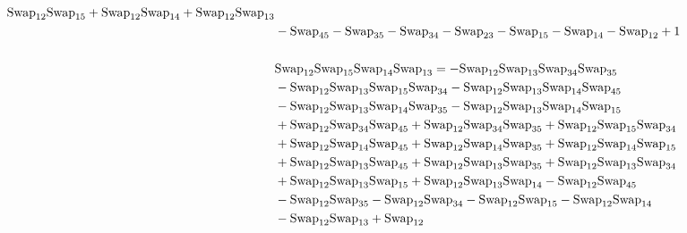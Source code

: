 \documentclass[12pt,dvipsnames,accepted=2016-08-18,a4paper,onecolumn]{quantumarticle}
\numberwithin{equation}{section}
\theoremstyle{definition}
\begin{document}
\begin{align*}
        \textnormal{Swap}_{12} \textnormal{Swap}_{15} + \textnormal{Swap}_{12} \textnormal{Swap}_{14} + \textnormal{Swap}_{12} \textnormal{Swap}_{13}\\ & - \textnormal{Swap}_{45} - \textnormal{Swap}_{35} - \textnormal{Swap}_{34} - \textnormal{Swap}_{23} - \textnormal{Swap}_{15} - \textnormal{Swap}_{14} - \textnormal{Swap}_{12} +
        1\\
        \\
        &\textnormal{Swap}_{12}   \textnormal{Swap}_{15}   \textnormal{Swap}_{14}   \textnormal{Swap}_{13} = -\textnormal{Swap}_{12} \textnormal{Swap}_{13} \textnormal{Swap}_{34} \textnormal{Swap}_{35}\\ & - \textnormal{Swap}_{12} \textnormal{Swap}_{13} \textnormal{Swap}_{15} \textnormal{Swap}_{34} - \textnormal{Swap}_{12} \textnormal{Swap}_{13} \textnormal{Swap}_{14} \textnormal{Swap}_{45}\\ & - \textnormal{Swap}_{12} \textnormal{Swap}_{13} \textnormal{Swap}_{14} \textnormal{Swap}_{35} -
        \textnormal{Swap}_{12} \textnormal{Swap}_{13} \textnormal{Swap}_{14} \textnormal{Swap}_{15}\\ & + \textnormal{Swap}_{12} \textnormal{Swap}_{34} \textnormal{Swap}_{45} + \textnormal{Swap}_{12} \textnormal{Swap}_{34} \textnormal{Swap}_{35} + \textnormal{Swap}_{12} \textnormal{Swap}_{15} \textnormal{Swap}_{34}\\ & + \textnormal{Swap}_{12} \textnormal{Swap}_{14} \textnormal{Swap}_{45}
        + \textnormal{Swap}_{12} \textnormal{Swap}_{14} \textnormal{Swap}_{35} + \textnormal{Swap}_{12} \textnormal{Swap}_{14} \textnormal{Swap}_{15}\\ & + \textnormal{Swap}_{12} \textnormal{Swap}_{13} \textnormal{Swap}_{45} + \textnormal{Swap}_{12} \textnormal{Swap}_{13} \textnormal{Swap}_{35} + \textnormal{Swap}_{12} \textnormal{Swap}_{13} \textnormal{Swap}_{34}\\ & +
        \textnormal{Swap}_{12} \textnormal{Swap}_{13} \textnormal{Swap}_{15} + \textnormal{Swap}_{12} \textnormal{Swap}_{13} \textnormal{Swap}_{14} - \textnormal{Swap}_{12} \textnormal{Swap}_{45}\\ & - \textnormal{Swap}_{12} \textnormal{Swap}_{35} - \textnormal{Swap}_{12} \textnormal{Swap}_{34} - \textnormal{Swap}_{12} \textnormal{Swap}_{15} -
        \textnormal{Swap}_{12} \textnormal{Swap}_{14}\\ & - \textnormal{Swap}_{12} \textnormal{Swap}_{13} + \textnormal{Swap}_{12}\\
        \\ 

\end{align*}
\end{document}
